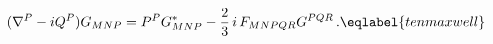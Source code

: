 \begin{equation}
(\nabla^P-i Q^P) G_{MNP}= P^P G^*_{MNP}-\frac 23\,i\,F_{MNPQR}
G^{PQR}\,.
\eqlabel{tenmaxwell}
\end{equation}

